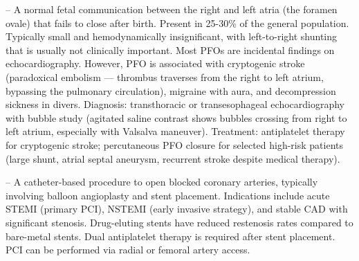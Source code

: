 -- A normal fetal communication between the right and left atria (the foramen ovale) that fails to close after birth. Present in 25-30\% of the general population. Typically small and hemodynamically insignificant, with left-to-right shunting that is usually not clinically important. Most PFOs are incidental findings on echocardiography. However, PFO is associated with cryptogenic stroke (paradoxical embolism — thrombus traverses from the right to left atrium, bypassing the pulmonary circulation), migraine with aura, and decompression sickness in divers. Diagnosis: transthoracic or transesophageal echocardiography with bubble study (agitated saline contrast shows bubbles crossing from right to left atrium, especially with Valsalva maneuver). Treatment: antiplatelet therapy for cryptogenic stroke; percutaneous PFO closure for selected high-risk patients (large shunt, atrial septal aneurysm, recurrent stroke despite medical therapy).

-- A catheter-based procedure to open blocked coronary arteries, typically involving balloon angioplasty and stent placement. Indications include acute STEMI (primary PCI), NSTEMI (early invasive strategy), and stable CAD with significant stenosis. Drug-eluting stents have reduced restenosis rates compared to bare-metal stents. Dual antiplatelet therapy is required after stent placement. PCI can be performed via radial or femoral artery access.

